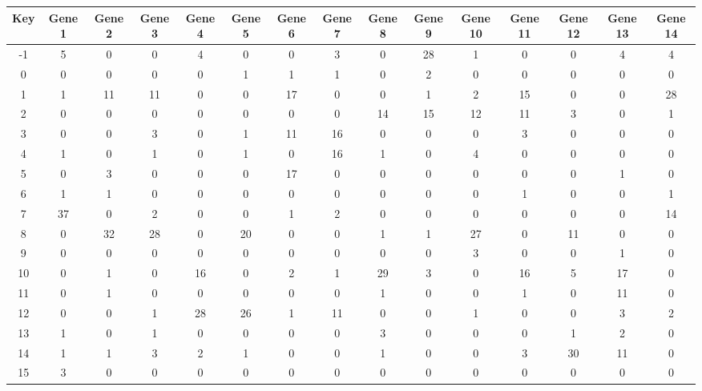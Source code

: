 \begin{tabular}{|c|c|c|c|c|c|c|c|c|c|c|c|c|c|c|}
\hline
Key & Gene 1 & Gene 2 & Gene 3 & Gene 4 & Gene 5 & Gene 6 & Gene 7 & Gene 8 & Gene 9 & Gene 10 & Gene 11 & Gene 12 & Gene 13 & Gene 14 \\
\hline
-1 & 5 & 0 & 0 & 4 & 0 & 0 & 3 & 0 & 28 & 1 & 0 & 0 & 4 & 4 \\
0 & 0 & 0 & 0 & 0 & 1 & 1 & 1 & 0 & 2 & 0 & 0 & 0 & 0 & 0 \\
1 & 1 & 11 & 11 & 0 & 0 & 17 & 0 & 0 & 1 & 2 & 15 & 0 & 0 & 28 \\
2 & 0 & 0 & 0 & 0 & 0 & 0 & 0 & 14 & 15 & 12 & 11 & 3 & 0 & 1 \\
3 & 0 & 0 & 3 & 0 & 1 & 11 & 16 & 0 & 0 & 0 & 3 & 0 & 0 & 0 \\
4 & 1 & 0 & 1 & 0 & 1 & 0 & 16 & 1 & 0 & 4 & 0 & 0 & 0 & 0 \\
5 & 0 & 3 & 0 & 0 & 0 & 17 & 0 & 0 & 0 & 0 & 0 & 0 & 1 & 0 \\
6 & 1 & 1 & 0 & 0 & 0 & 0 & 0 & 0 & 0 & 0 & 1 & 0 & 0 & 1 \\
7 & 37 & 0 & 2 & 0 & 0 & 1 & 2 & 0 & 0 & 0 & 0 & 0 & 0 & 14 \\
8 & 0 & 32 & 28 & 0 & 20 & 0 & 0 & 1 & 1 & 27 & 0 & 11 & 0 & 0 \\
9 & 0 & 0 & 0 & 0 & 0 & 0 & 0 & 0 & 0 & 3 & 0 & 0 & 1 & 0 \\
10 & 0 & 1 & 0 & 16 & 0 & 2 & 1 & 29 & 3 & 0 & 16 & 5 & 17 & 0 \\
11 & 0 & 1 & 0 & 0 & 0 & 0 & 0 & 1 & 0 & 0 & 1 & 0 & 11 & 0 \\
12 & 0 & 0 & 1 & 28 & 26 & 1 & 11 & 0 & 0 & 1 & 0 & 0 & 3 & 2 \\
13 & 1 & 0 & 1 & 0 & 0 & 0 & 0 & 3 & 0 & 0 & 0 & 1 & 2 & 0 \\
14 & 1 & 1 & 3 & 2 & 1 & 0 & 0 & 1 & 0 & 0 & 3 & 30 & 11 & 0 \\
15 & 3 & 0 & 0 & 0 & 0 & 0 & 0 & 0 & 0 & 0 & 0 & 0 & 0 & 0 \\
\hline
\end{tabular}